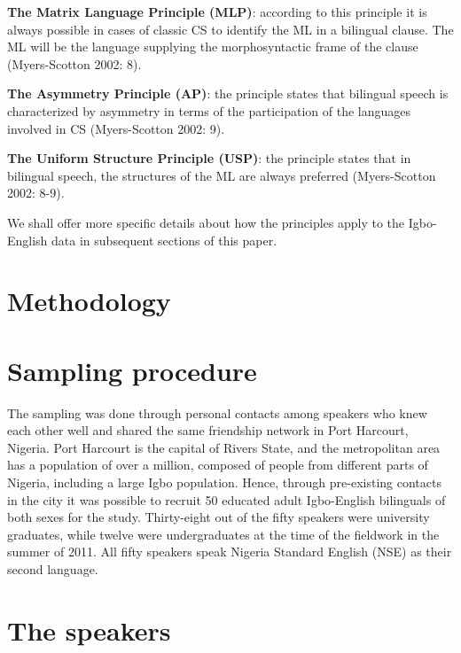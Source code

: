 \documentclass[output=paper]{langsci/langscibook}
\begin{document}
\begin{stylelsBulletList}
\textbf{The Matrix Language Principle (MLP)}: according to this principle it is always possible in cases of classic CS to identify the ML in a bilingual clause. The ML will be the language supplying the morphosyntactic frame of the clause (Myers-Scotton 2002: 8). 
\end{stylelsBulletList}

\begin{stylelsBulletList}
\textbf{The Asymmetry Principle (AP)}: the principle states that bilingual speech is characterized by asymmetry in terms of the participation of the languages involved in CS (Myers-Scotton 2002: 9). 
\end{stylelsBulletList}

\begin{stylelsBulletList}
\textbf{The Uniform Structure Principle (USP)}: the principle states that in bilingual speech, the structures of the ML are always preferred (Myers-Scotton 2002: 8-9).
\end{stylelsBulletList}

We shall offer more specific details about how the principles apply to the Igbo-English data in subsequent sections of this paper.

\section{ Methodology}

\section{Sampling procedure}

The sampling was done through personal contacts among speakers who knew each other well and shared the same friendship network in Port Harcourt, Nigeria. Port Harcourt is the capital of Rivers State, and the metropolitan area has a population of over a million, composed of people from different parts of Nigeria, including a large Igbo population. Hence, through pre-existing contacts in the city it was possible to recruit 50 educated adult Igbo-English bilinguals of both sexes for the study. Thirty-eight out of the fifty speakers were university graduates, while twelve were undergraduates at the time of the fieldwork in the summer of 2011. All fifty speakers speak Nigeria Standard English (NSE) as their second language.

\section{The speakers}
\end{document}
